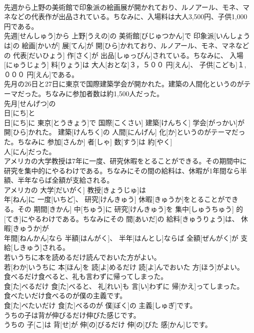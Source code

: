 \documentclass[8pt]{extreport}
\begin{document}
\begin{CJK}{UTF8}{min}
\\	先週から上野の美術館で印象派の絵画展が開かれており、ルノアール、モネ、マネなどの代表作が出品されている。ちなみに、入場料は大人3,500円、子供1,000円である。	
\\	先週[せんしゅう]から 上野[うえの]の 美術館[びじゅつかん]で 印象派[いんしょうは]の 絵画[かいが] 展[てん]が 開[ひら]かれており、ルノアール、モネ、マネなどの 代表[だいひょう] 作[さく]が 出品[しゅっぴん]されている。ちなみに、 入場[にゅうじょう] 料[りょう]は 大人[おとな]３，５００ 円[えん]、 子供[こども]１,０００ 円[えん]である。
\\	先月の26日と27日に東京で国際建築学会が開かれた。建築の人間化というのがテーマだった。ちなみに参加者数は約1,500人だった。	
\\	先月[せんげつ]の 
\\	日[にち]と 
\\	日[にち]に 東京[とうきょう]で 国際[こくさい] 建築[けんちく] 学会[がっかい]が 開[ひら]かれた。 建築[けんちく]の 人間[にんげん] 化[か]というのがテーマだった。ちなみに 参加[さんか] 者[しゃ] 数[すう]は 約[やく] 
\\	人[にん]だった。
\\	アメリカの大学教授は7年に一度、研究休暇をとることができる。その期間中に研究を集中的にやるわけである。ちなみにその間の給料は、休暇が1年間なら半額、半年ならば全額が支給される。	
\\	アメリカの 大学[だいがく] 教授[きょうじゅ]は 
\\	年[ねん]に 一度[いちど]、 研究[けんきゅう] 休暇[きゅうか]をとることができる。その 期間[きかん] 中[ちゅう]に 研究[けんきゅう]を 集中[しゅうちゅう] 的[てき]にやるわけである。ちなみにその 間[あいだ]の 給料[きゅうりょう]は、 休暇[きゅうか]が 
\\	年間[ねんかん]なら 半額[はんがく]、 半年[はんとし]ならば 全額[ぜんがく]が 支給[しきゅう]される。
\\	若いうちに本を読めるだけ読んでおいた方がよい。	
\\	若[わか]いうちに 本[ほん]を 読[よ]めるだけ 読[よ]んでおいた 方[ほう]がよい。
\\	食べるだけ食べると、礼も言わずに帰ってしまった。	
\\	食[た]べるだけ 食[た]べると、 礼[れい]も 言[い]わずに 帰[かえ]ってしまった。
\\	食べたいだけ食べるのが僕の主義です。	
\\	食[た]べたいだけ 食[た]べるのが 僕[ぼく]の 主義[しゅぎ]です。
\\	うちの子は背が伸びるだけ伸びた感じです。	
\\	うちの 子[こ]は 背[せ]が 伸[の]びるだけ 伸[の]びた 感[かん]じです。

\end{CJK}
\end{document}
